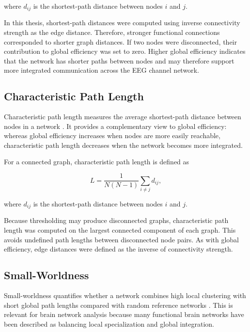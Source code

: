where $d_{ij}$ is the shortest-path distance between nodes $i$ and $j$.

In this thesis, shortest-path distances were computed using inverse
connectivity strength as the edge distance. Therefore, stronger functional
connections corresponded to shorter graph distances. If two nodes were
disconnected, their contribution to global efficiency was set to zero. Higher
global efficiency indicates that the network has shorter paths between nodes
and may therefore support more integrated communication across the EEG channel
network.

\subsection{Characteristic Path Length}
\label{subsec:characteristic-path-length}

Characteristic path length measures the average shortest-path distance between
nodes in a network \cite{Watts1998,Rubinov2010}. It provides a complementary view to global efficiency:
whereas global efficiency increases when nodes are more easily reachable,
characteristic path length decreases when the network becomes more integrated.

For a connected graph, characteristic path length is defined as

\[
    L =
    \frac{1}{N(N-1)}
    \sum_{i \neq j}
    d_{ij},
\]

where $d_{ij}$ is the shortest-path distance between nodes $i$ and $j$.

Because thresholding may produce disconnected graphs, characteristic path
length was computed on the largest connected component of each graph. This
avoids undefined path lengths between disconnected node pairs. As with global
efficiency, edge distances were defined as the inverse of connectivity strength.

\subsection{Small-Worldness}
\label{subsec:small-worldness}

Small-worldness quantifies whether a network combines high local clustering
with short global path lengths compared with random reference networks \cite{Watts1998,Humphries2008,Rubinov2010}. This is
relevant for brain network analysis because many functional brain networks have
been described as balancing local specialization and global integration.

